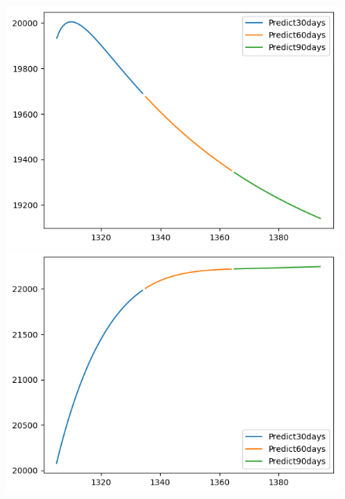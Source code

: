 \begin{figure}[H]
\begin{minipage}{0.15\textwidth}
    \includegraphics[width=1\textwidth]{resources/chapter-5/newdata1/predicted/EXIM_GRU_7_3_30days.png}
    \end{minipage}
    \hfill
    \begin{minipage}{0.15\textwidth}
    \centering
    \includegraphics[width=1\textwidth]{resources/chapter-5/newdata1/predicted/EXIM_GRU_8_2_30days.png}
    \end{minipage}
    \hfill
        \begin{minipage}{0.15\textwidth}
    \centering

\end{minipage}
\end{figure}
